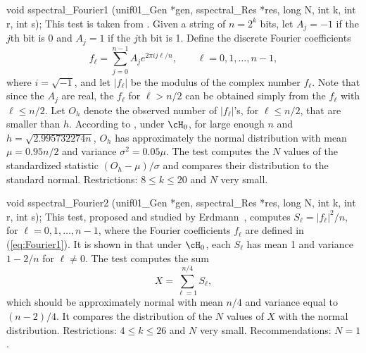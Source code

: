 void sspectral_Fourier1 (unif01_Gen *gen, sspectral_Res *res,
                         long N, int k, int r, int s);
\endcode
\tab
   This test is taken from \cite{rRUK01a}. %
   Given a string of $n= 2^k$ bits, let $A_j = -1$ if the $j${th} bit 
   is 0 and $A_j = 1$ if the $j$th bit is 1.
   Define the discrete Fourier coefficients
\begin{equation}
   f_\ell = \sum_{j=0}^{n-1} A_j e^{2\pi i j\ell/n},\qquad 
    \ell = 0, 1, \ldots,n-1, \label{eq:Fourier1}
\end{equation}
   where $i = \sqrt{-1}$, and let $|f_\ell|$ be the modulus of the
   complex number $f_\ell$. 
   Note that since the $A_j$ are real, 
   the $f_\ell$ for $\ell > n/2$ can be obtained
   simply from the $f_\ell$ with $\ell \le n/2$. 
   Let $O_h$ denote the observed number of $|f_\ell|$'s, for $\ell \le n/2$, 
   that are smaller than $h$. 
   According to \cite{rRUK01a}, under $\cH_0$, for large enough 
   $n$ and $h = \sqrt{2.995732274n}$, $O_h$ has approximately the
   normal distribution with mean $\mu = 0.95 n/2$ and variance 
   $\sigma^2 = 0.05 \mu$.
   The test computes the $N$ values of the standardized statistic
   $(O_h - \mu)/\sigma$ and compares their distribution to the standard
   normal.
  Restrictions: $8 \le k \le 20$ and $N$ very small.
\endtab
\code


void sspectral_Fourier2 (unif01_Gen *gen, sspectral_Res *res,
                         long N, int k, int r, int s);
\endcode
\tab
  This test, proposed and studied by Erdmann~\cite{rERD92a},
  computes $S_\ell = |f_\ell|^2/n$,  %
  for $\ell = 0, 1, \ldots,n-1$, where the Fourier coefficients
  $f_\ell$ are defined in (\ref{eq:Fourier1}).
  It is shown in \cite{rERD92a} that under $\cH_0$, 
  each $S_\ell$ has mean 1 and variance $1 -  2 /n$ for $ \ell \not= 0$.
  The test computes the sum 
 $$
  X = \sum_{\ell= 1}^{n/4} S_\ell,
$$
  which should be approximately normal 
with mean $n/4$ and variance equal to $(n-2)/4$.
  It compares the distribution of the $N$ values of $X$ 
  with the normal distribution.
  Restrictions: $4 \le k \le 26$ and $N$ very small.
  Recommendations: $N=1$.
\endtab
\code



